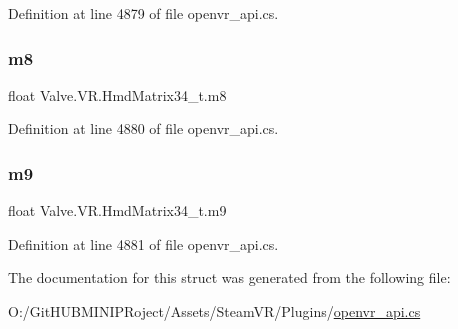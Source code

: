 Definition at line 4879 of file openvr\+\_\+api.\+cs.

\mbox{\label{struct_valve_1_1_v_r_1_1_hmd_matrix34__t_ab5972fa50a970adab621719b9aaa47bf}} 
\subsubsection{\texorpdfstring{m8}{m8}}
{\footnotesize\ttfamily float Valve.\+V\+R.\+Hmd\+Matrix34\+\_\+t.\+m8}



Definition at line 4880 of file openvr\+\_\+api.\+cs.

\mbox{\label{struct_valve_1_1_v_r_1_1_hmd_matrix34__t_aba4fb1da697d3479b2b7448b339f4b9f}} 
\subsubsection{\texorpdfstring{m9}{m9}}
{\footnotesize\ttfamily float Valve.\+V\+R.\+Hmd\+Matrix34\+\_\+t.\+m9}



Definition at line 4881 of file openvr\+\_\+api.\+cs.



The documentation for this struct was generated from the following file\+:\begin{DoxyCompactItemize}
\item 
O\+:/\+Git\+H\+U\+B\+M\+I\+N\+I\+P\+Roject/\+Assets/\+Steam\+V\+R/\+Plugins/\mbox{\hyperlink{openvr__api_8cs}{openvr\+\_\+api.\+cs}}\end{DoxyCompactItemize}
